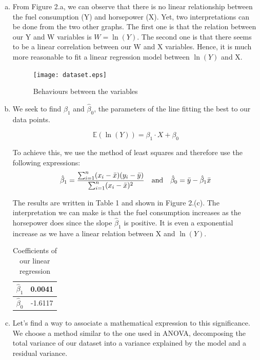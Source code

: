 \documentclass[a4paper]{article}
\begin{document}
\begin{enumerate}[(a)]

\item From Figure 2.a, we can observe that there is no linear relationship between the fuel consumption (Y) and horsepower (X). Yet, two interpretations can be done from the two other graphs. The first one is that the relation between our Y and W variables is $W = \ln(Y)$. The second one is that there seems to be a linear correlation between our W and X variables. Hence, it is much more reasonable to fit a linear regression model between $\ln(Y)$ and X.

\begin{figure}
    \centering
    \texttt{[image: dataset.eps]}
    \caption{Behaviours between the variables}
\end{figure}

\item We seek to find $\hat{\beta}_1$ and $\hat{\beta}_0$, the parameters of the line fitting the best to our data points. 

$$\mathbb{E}(\ln(Y)) = \beta_1 \cdot X + \beta_0$$

To achieve this, we use the method of least squares and therefore use the following expressions:
$$\hat{\beta}_1 = \frac{\sum_{i=1}^{n}(x_i-\bar{x})(y_i-\bar{y})}{\sum_{i=1}^n(x_i-\bar{x})^2}
\quad \textup{and} \quad \hat{\beta}_0 = \bar{y} - \hat{\beta}_1 \bar{x}$$

The results are written in Table 1 and shown in Figure 2.(c). The interpretation we can make is that the fuel consumption increases as the horsepower does since the slope $\hat{\beta}_1$ is positive. It is even a exponential increase as we have a linear relation between X and $\ln(Y)$.

\begin{table}[h]
    \begin{centering}
    \begin{tabular}{|c|c|}
    \hline 
    $\hat{\beta}_1$ & 0.0041\tabularnewline
    \hline 
    $\hat{\beta}_0$ & -1.6117\tabularnewline
    \hline 
    \end{tabular}
    \par\end{centering}
    \caption{Coefficients of our linear regression}
\end{table}

\item Let's find a way to associate a mathematical expression to this significance. We choose a method similar to the one used in ANOVA, decomposing the total variance of our dataset into a variance explained by the model and a residual variance. 


\end{enumerate}
\end{document}
